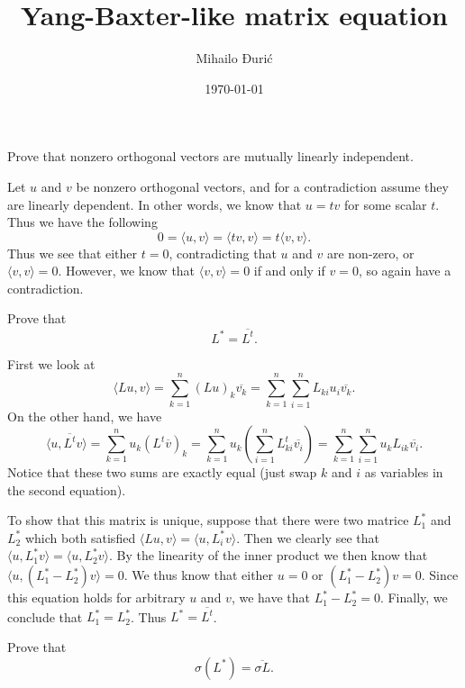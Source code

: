\documentclass{article}
\title{Yang-Baxter-like matrix equation}
\author{Mihailo Đurić}
\date{\today}
\begin{document}
\maketitle
\newpage

\begin{problem}
  Prove that nonzero orthogonal vectors are mutually linearly independent.
\end{problem}

\begin{solution}
  Let $u$ and $v$ be nonzero orthogonal vectors, and for a contradiction assume they are linearly dependent.
  In other words, we know that $u = t v$ for some scalar $t$.
  Thus we have the following
  \[0 = \langle u, v \rangle = \langle t v, v \rangle = t \langle v, v \rangle.\]
  Thus we see that either $t = 0$, contradicting that $u$ and $v$ are non-zero, or $\langle v, v \rangle = 0$.
  However, we know that $\langle v, v \rangle = 0$ if and only if $v = 0$, so again have a contradiction.
\end{solution}

\begin{problem}
  Prove that
  \[L^* = \overline{L^t}.\]
\end{problem}

\begin{solution}
  First we look at
  \[\langle Lu, v \rangle = \sum_{k=1}^{n} (Lu)_k \overline{v_k} = \sum_{k=1}^{n} \sum_{i=1}^{n} L_{ki} u_i \overline{v_k}.\]
  On the other hand, we have
  \[\langle u, \overline{L^t} v \rangle = \sum_{k=1}^{n} u_k (L^t \overline{v})_k = \sum_{k=1}^{n} u_k (\sum_{i=1}^{n} L_{ki}^t \overline{v_i}) = \sum_{k=1}^{n} \sum_{i=1}^{n} u_k L_{ik} \overline{v_i}.\]
  Notice that these two sums are exactly equal (just swap $k$ and $i$ as variables in the second equation).

  To show that this matrix is unique, suppose that there were two matrice $L_1^*$ and $L_2^*$ which both satisfied $\langle L u, v \rangle = \langle u, L_i^* v \rangle$.
  Then we clearly see that $\langle u, L_1^* v \rangle = \langle u, L_2^* v \rangle$.
  By the linearity of the inner product we then know that $\langle u, (L_1^* - L_2^*) v \rangle = 0$.
  We thus know that either $u = 0$ or $(L_1^* - L_2^*) v = 0$.
  Since this equation holds for arbitrary $u$ and $v$, we have that $L_1^* - L_2^* = 0$.
  Finally, we conclude that $L_1^* = L_2^*$.
  Thus $L^* = \overline{L^t}$.
\end{solution}

\begin{problem}
  Prove that
  \[\sigma (L^*) = \overline{\sigma{L}}.\]
\end{problem}
\end{document}
